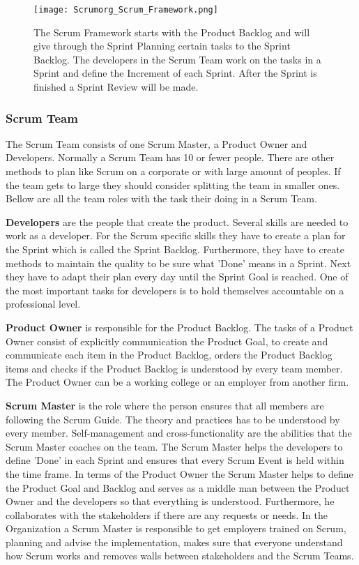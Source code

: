 \begin{figure}[H]
    \centering
    \texttt{[image: Scrumorg\_Scrum\_Framework.png]}
    \caption{The Scrum Framework starts with the Product Backlog and will give through the Sprint Planning certain tasks to the Sprint Backlog. The developers in the Scrum Team work on the tasks in a Sprint and define the Increment of each Sprint. After the Sprint is finished a Sprint Review will be made. \cite{scrum_guide}}
    \label{fig:Scrum Framework}
\end{figure}


\subsubsection{Scrum Team} \label{sec:Scrum Team}
The Scrum Team consists of one Scrum Master, a Product Owner and Developers. Normally a Scrum Team has 10 or fewer people. There are other methods to plan like Scrum on a corporate or with large amount of peoples. If the team gets to large they should consider splitting the team in smaller ones. Bellow are all the team roles with the task their doing in a Scrum Team. \cite{scrum_guide}

\textbf{Developers} are the people that create the product. Several skills are needed to work as a developer. For the Scrum specific skills they have to create a plan for the Sprint which is called the Sprint Backlog. Furthermore, they have to create methods to maintain the quality to be sure what 'Done' means in a Sprint. Next they have to adapt their plan every day until the Sprint Goal is reached. One of the most important tasks for developers is to hold themselves accountable on a professional level. \cite{scrum_guide}

\textbf{Product Owner} is responsible for the Product Backlog. The tasks of a Product Owner consist of explicitly communication the Product Goal, to create and communicate each item in the Product Backlog, orders the Product Backlog items and checks if the Product Backlog is understood by every team member. \cite{scrum_guide} The Product Owner can be a working college or an employer from another firm.

\textbf{Scrum Master} is the role where the person ensures that all members are following the Scrum Guide. The theory and practices has to be understood by every member. Self-management and cross-functionality are the abilities that the Scrum Master coaches on the team. The Scrum Master helps the developers to define 'Done' in each Sprint and ensures that every Scrum Event is held within the time frame. In terms of the Product Owner the Scrum Master helps to define the Product Goal and Backlog and serves as a middle man between the Product Owner and the developers so that everything is understood. Furthermore, he collaborates with the stakeholders if there are any requests or needs. In the Organization a Scrum Master is responsible to get employers trained on Scrum, planning and advise the implementation, makes sure that everyone understand how Scrum works and removes walls between stakeholders and the Scrum Teams. \cite{scrum_guide}

